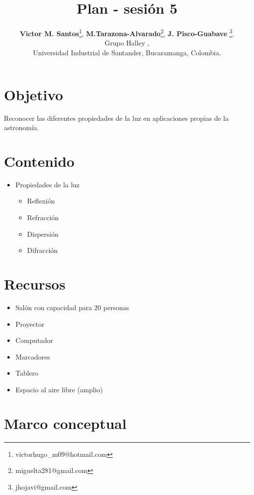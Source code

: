 \documentclass[10pt,a4paper]{article}
\title{Plan - sesión 5}
\author{\textbf{Victor M. Santos}\thanks{victorhugo\_m09@hotmail.com}, \textbf{M.Tarazona-Alvarado}\thanks{miguelta281@gmail.com}, \textbf{J. Pisco-Guabave} \thanks{jhojavi@gmail.com}. \\ Grupo Halley , \\ Universidad Industrial de Santander, Bucaramanga, Colombia.}
\date{ }
\begin{document}
\maketitle
\tableofcontents
\section{Objetivo}
Reconocer las diferentes propiedades de la luz en aplicaciones propias de la astronomía.

\section{Contenido}
\begin{itemize}
\item Propiedades de la luz
\begin{itemize}
\item Reflexión
\item Refracción
\item Dispersión
\item Difracción
\end{itemize}
\end{itemize}


\section{Recursos}
\begin{itemize}
 \item Salón con capacidad para 20 personas
 \item Proyector
 \item Computador
 \item Marcadores
 \item Tablero
 \item Espacio al aire libre (amplio)
\end{itemize}

\section{Marco conceptual}
\end{document}
